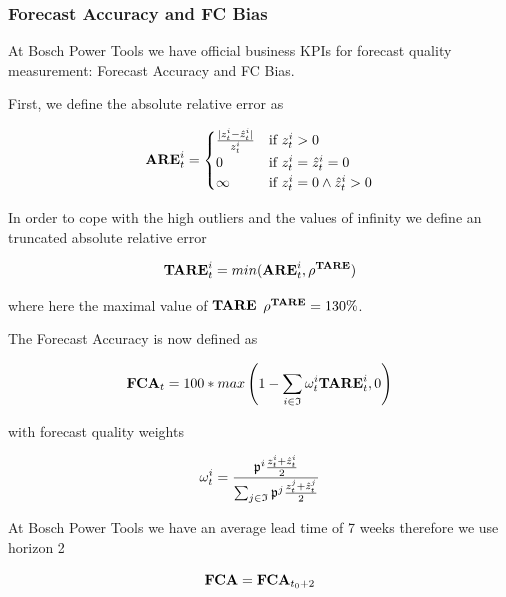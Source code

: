 \documentclass[11pt,headings=small]{scrartcl}
\begin{document}
\subsubsection{Forecast Accuracy and FC Bias}
\label{subsubsection:FCAFCB}

At Bosch Power Tools we have official business KPIs for forecast quality measurement: Forecast Accuracy and FC Bias.

First, we define the absolute relative error as 

\begin{equation}\label{are}
\textbf{ARE}^{i}_{t} = 
\begin{cases}
\frac{|z^{i}_{t} - \hat{z}^{i}_{t}|}{z^{i}_{t}} 	& 	\text{if } z^{i}_{t} > 0 \\
0 															&	\text{if } z^{i}_{t} =\hat{z}^{i}_{t} = 0 \\
\infty 														&	\text{if } z^{i}_{t} = 0 \land \hat{z}^{i}_{t} > 0
\end{cases} 
\end{equation}

In order to cope with the high outliers and the values of infinity we define an truncated absolute relative error

\begin{equation}\label{tare}
\textbf{TARE}^{i}_{t} = min(\textbf{ARE}^{i}_{t},\rho^\textbf{TARE})
\end{equation}

where here the maximal value of $\textbf{TARE}$ $\rho^\textbf{TARE}=130\%$.

The Forecast Accuracy is now defined as

\begin{equation}\label{fca}
\textbf{FCA}_{t} = 100 * max\left( 1 - \sum_{i\in\frak{I}}\omega^{i}_{t}\textbf{TARE}^{i}_{t} , 0\right)
\end{equation}

with forecast quality weights

\begin{equation}\label{fcaweights}
\omega^{i}_{t} = \frac{\frak{p}^{i}\frac{z^{i}_{t} + \hat{z}^{i}_{t}}{2}} {\sum_{j\in\frak{I}}\frak{p}^{j}\frac{z_{t}^{j} + \hat{z}_{t}^{j}}{2}}
\end{equation}

At Bosch Power Tools we have an average lead time of 7 weeks therefore we use horizon 2 

\begin{equation}\label{fca2}
\textbf{FCA} = \textbf{FCA}_{t_{0} + 2}
\end{equation}
\end{document}
